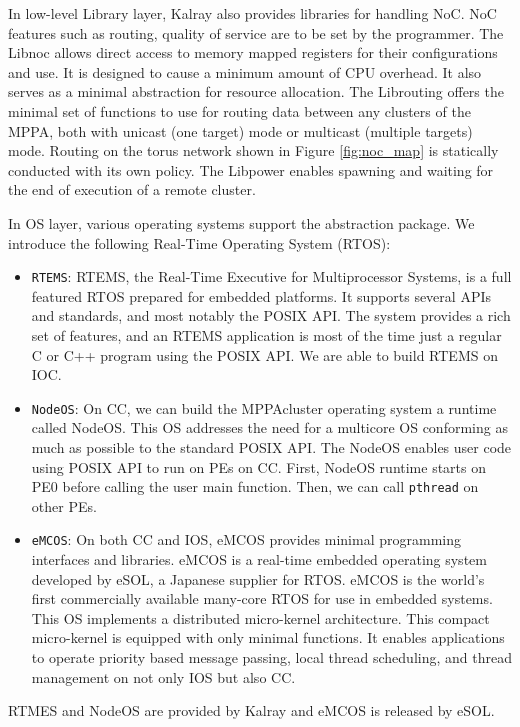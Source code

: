 \documentclass{sig-alternate-05-2015}
\begin{document}
In low-level Library layer, Kalray also provides libraries for handling NoC.
NoC features such as routing, quality of service are to be set by the programmer.
The Libnoc allows direct access to memory mapped registers for their configurations and use.
It is designed to cause a minimum amount of CPU overhead.
It also serves as a minimal abstraction for resource allocation.
The Librouting offers the minimal set of functions to use for routing data between any clusters of the MPPA,
both with unicast (one target) mode or multicast (multiple targets) mode.
Routing on the torus network shown in Figure \ref{fig:noc_map} is statically conducted with its own policy.
The Libpower enables spawning and waiting for the end of execution of a remote cluster.

In OS layer, various operating systems support the abstraction package.
We introduce the following Real-Time Operating System (RTOS):
\begin{itemize}
\item \verb+RTEMS+: RTEMS, the Real-Time Executive for Multiprocessor Systems, is a full featured RTOS prepared for embedded platforms.
It supports several APIs and standards, and most notably the POSIX API.
The system provides a rich set of features, and an RTEMS application is most of the time just a regular C or C++ program using the POSIX API.
We are able to build RTEMS on IOC.
\item \verb+NodeOS+: On CC, we can build the MPPAcluster operating system a runtime called NodeOS.
This OS addresses the need for a multicore OS conforming as much as possible to the standard POSIX API.
The NodeOS enables user code using POSIX API to run on PEs on CC.
First, NodeOS runtime starts on PE0 before calling the user main function.
Then, we can call \texttt{pthread} on other PEs.
\item \verb+eMCOS+: On both CC and IOS, eMCOS provides minimal programming interfaces and libraries.
eMCOS is a real-time embedded operating system developed by eSOL, a Japanese supplier for RTOS.
eMCOS is the world's first commercially available many-core RTOS for use in embedded systems.
This OS implements a distributed micro-kernel architecture.
This compact micro-kernel is equipped with only minimal functions.
It enables applications to operate priority based message passing, local thread scheduling, and thread management on not only IOS but also CC.
\end{itemize}
RTMES and NodeOS are provided by Kalray and eMCOS is released by eSOL.
\end{document}
